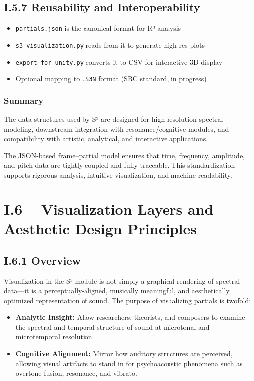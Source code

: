 \subsection*{I.5.7 Reusability and Interoperability}

\begin{itemize}
    \item \texttt{partials.json} is the canonical format for R³ analysis
    \item \texttt{s3\_visualization.py} reads from it to generate high-res plots
    \item \texttt{export\_for\_unity.py} converts it to CSV for interactive 3D display
    \item Optional mapping to \texttt{.S3N} format (SRC standard, in progress)
\end{itemize}

\subsubsection*{Summary}

The data structures used by S³ are designed for high-resolution spectral modeling, downstream integration with resonance/cognitive modules, and compatibility with artistic, analytical, and interactive applications.

The JSON-based frame–partial model ensures that time, frequency, amplitude, and pitch data are tightly coupled and fully traceable. This standardization supports rigorous analysis, intuitive visualization, and machine readability.

\section*{I.6 – Visualization Layers and Aesthetic Design Principles}

\subsection*{I.6.1 Overview}

Visualization in the S³ module is not simply a graphical rendering of spectral data—it is a perceptually-aligned, musically meaningful, and aesthetically optimized representation of sound. The purpose of visualizing partials is twofold:

\begin{itemize}
    \item \textbf{Analytic Insight:} Allow researchers, theorists, and composers to examine the spectral and temporal structure of sound at microtonal and microtemporal resolution.
    \item \textbf{Cognitive Alignment:} Mirror how auditory structures are perceived, allowing visual artifacts to stand in for psychoacoustic phenomena such as overtone fusion, resonance, and vibrato.
\end{itemize}

